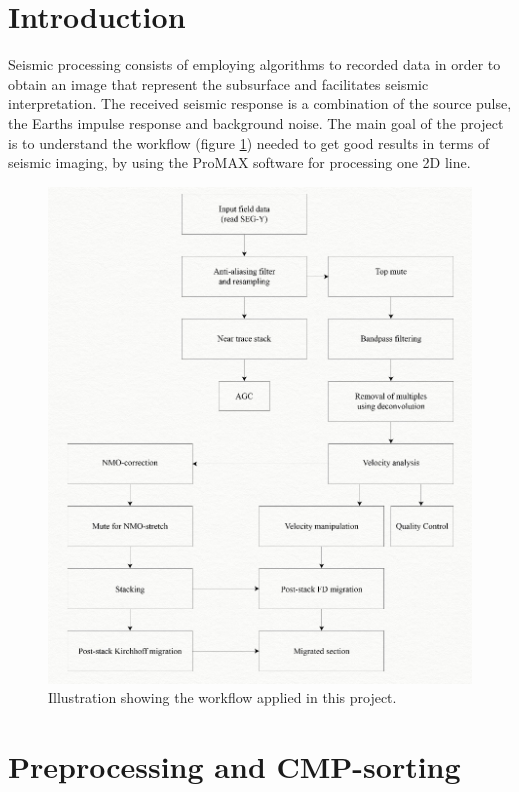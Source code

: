 \documentclass[10pt,a4paper]{article}
\begin{document}
\newpage

\tableofcontents

\newpage

\section{Introduction}

Seismic processing consists of employing algorithms to recorded data in order to obtain an image that represent the subsurface and facilitates seismic interpretation. The received seismic response is a combination of the source pulse, the Earths impulse response and background noise. The main goal of the project is to understand the workflow (figure \ref{wf}) needed to get good results in terms of seismic imaging, by using the ProMAX software for processing one 2D line.

\begin{figure}[H]
\centering
\includegraphics[scale=0.3]{wf3.jpg}
\caption{Illustration showing the workflow applied in this project.}
\label{wf}
\end{figure}


\section{Preprocessing and CMP-sorting}
\end{document}

